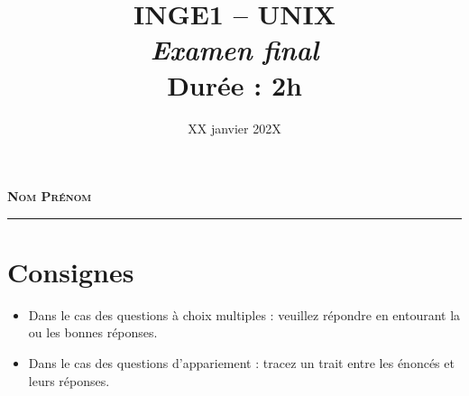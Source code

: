 \documentclass[11pt,a4paper]{article}
\title{\textsc{INGE1 -- UNIX}\\
    \emph{Examen final} \\
    Durée : 2h
}
\date{XX janvier 202X}
\begin{document}
\maketitle

\thispagestyle{empty}
\begin{figure}[!h]
    \centering
\end{figure}

\vfill
{\noindent\Large \textbf{\textsc{Nom Prénom}}}\\[1cm]
\rule{0.8\textwidth}{1pt}

\vfill
\noindent{}
\newpage

\section*{Consignes}
\begin{itemize}
    \item Dans le cas des questions à choix multiples : veuillez répondre en entourant la ou les bonnes réponses. 
    \item Dans le cas des questions d'appariement : tracez un trait entre les énoncés et leurs réponses.
\end{itemize}
\end{document}
